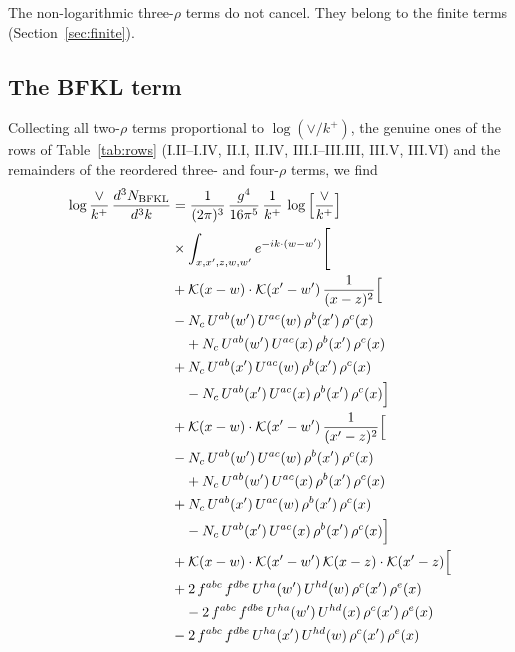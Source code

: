 The non-logarithmic three-$\rho$ terms do not cancel. They belong to the finite terms (Section~\ref{sec:finite}).

\subsection{The BFKL term}\label{sec:BFKL}

Collecting all two-$\rho$ terms proportional to $\log(\vee/k^+)$, the genuine ones of the rows of Table~\ref{tab:rows} (I.II--I.IV, II.I, II.IV, III.I--III.III, III.V, III.VI) and the remainders of the reordered three- and four-$\rho$ terms, we find
\begin{align}\label{eq:BFKLrho}
\log\frac{\vee}{k^+}\,\frac{d^{3}N_{\rm BFKL}}{d^{3}k} & = \frac{1}{(2\pi)^{3}}\,\frac{g^{4}}{16\pi^{5}}\,\frac{1}{k^{+}}\,\log\Big[\frac{\vee}{k^{+}}\Big]\notag\\&\times\int_{x,x',z,w,w'}e^{-ik\cdot (w-w')}\Bigg[ \notag\\
& +\mathcal{K}(x-w)\cdot\mathcal{K}(x'-w')\,\frac{1}{(x-z)^{2}}\Big[\notag\\
& -N_{c}\,U^{ab}(w')\,U^{ac}(w)\,\rho^{b}(x')\,\rho^{c}(x)\notag\\
&\quad +N_{c}\,U^{ab}(w')\,U^{ac}(x)\,\rho^{b}(x')\,\rho^{c}(x)\notag\\
& +N_{c}\,U^{ab}(x')\,U^{ac}(w)\,\rho^{b}(x')\,\rho^{c}(x) \notag\\
&\quad -N_{c}\,U^{ab}(x')\,U^{ac}(x)\,\rho^{b}(x')\,\rho^{c}(x)\Big]\notag\\
& +\mathcal{K}(x-w)\cdot\mathcal{K}(x'-w')\,\frac{1}{(x'-z)^{2}}\Big[\notag\\
& -N_{c}\,U^{ab}(w')\,U^{ac}(w)\,\rho^{b}(x')\,\rho^{c}(x)\notag\\
&\quad +N_{c}\,U^{ab}(w')\,U^{ac}(x)\,\rho^{b}(x')\,\rho^{c}(x)\notag\\
& +N_{c}\,U^{ab}(x')\,U^{ac}(w)\,\rho^{b}(x')\,\rho^{c}(x) \notag\\
&\quad -N_{c}\,U^{ab}(x')\,U^{ac}(x)\,\rho^{b}(x')\,\rho^{c}(x)\Big]\notag\\
& +\mathcal{K}(x-w)\cdot\mathcal{K}(x'-w')\,\mathcal{K}(x-z)\cdot\mathcal{K}(x'-z)\Big[\notag\\
& +2\,f^{abc}\,f^{dbe}\,U^{ha}(w')\,U^{hd}(w)\,\rho^{c}(x')\,\rho^{e}(x)\notag\\
&\quad -2\,f^{abc}\,f^{dbe}\,U^{ha}(w')\,U^{hd}(x)\,\rho^{c}(x')\,\rho^{e}(x)\notag\\
& -2\,f^{abc}\,f^{dbe}\,U^{ha}(x')\,U^{hd}(w)\,\rho^{c}(x')\,\rho^{e}(x) \notag\\

\end{align}
